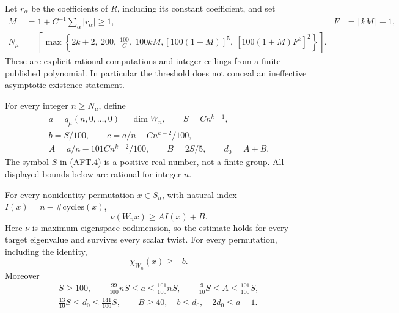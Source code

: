 Let $r_\alpha$ be the coefficients of $R$, including its
constant coefficient, and set
\[
 \begin{aligned}
 M&=1+C^{-1}\sum_\alpha|r_\alpha|\ge1,
 &F&=\lceil kM\rceil+1,\\
 N_\mu&=\left\lceil\max\left\{
 2k+2,\ 200,\ \frac{100}{C},\ 100kM,
 [100(1+M)]^5,\ [100(1+M)F^k]^2
 \right\}\right\rceil .
 \end{aligned}                                         \tag{AFT.3}
\]
These are explicit rational computations and integer ceilings
from a finite published polynomial. In particular the threshold
does not conceal an ineffective asymptotic existence statement.

For every integer $n\ge N_\mu$, define
\[
 \begin{gathered}
 a=q_\mu(n,0,\ldots,0)=\dim W_n,\qquad S=Cn^{k-1},\\
 b=S/100,\qquad c=a/n-Cn^{k-2}/100,\\
 A=a/n-101Cn^{k-2}/100,\qquad B=2S/5,
 \qquad d_0=A+B.
 \end{gathered}                                        \tag{AFT.4}
\]
The symbol $S$ in (AFT.4) is a positive real number, not a
finite group. All displayed bounds below are rational for
integer $n$.

\begin{theorem}[D-AFT01]
For every nonidentity permutation $x\in S_n$, with natural
index $I(x)=n-\#\mathrm{cycles}(x)$,
\[
 \nu(W_nx)\ge AI(x)+B.                                 \tag{AFT.5}
\]
Here $\nu$ is maximum-eigenspace codimension, so the estimate
holds for every target eigenvalue and survives every scalar
twist. For every permutation, including the identity,
\[
 \chi_{W_n}(x)\ge-b.                                   \tag{AFT.6}
\]
Moreover
\[
 \begin{gathered}
 S\ge100,\qquad \tfrac{99}{100}nS\le a\le\tfrac{101}{100}nS,
 \qquad \tfrac9{10}S\le A\le\tfrac{101}{100}S,\\
 \tfrac{13}{10}S\le d_0\le\tfrac{141}{100}S,
 \qquad B\ge40,\quad b\le d_0,\quad 2d_0\le a-1.
 \end{gathered}                                        \tag{AFT.7}
\]
\end{theorem}

